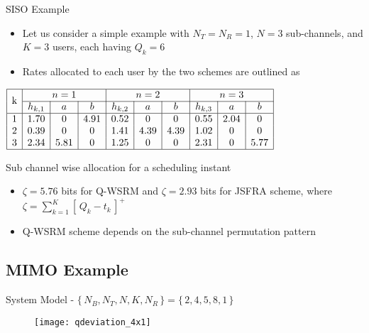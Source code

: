 \documentclass[10pt]{beamer}
\newcommand{\me}[1]{\( #1 \)}
\begin{document}
\begin{frame}{\acs{SISO} Example}
\begin{itemize}
\item Let us consider a simple example with \me{N_T = N_R = 1}, \me{N=3} sub-channels, and \me{K = 3} users, each having \me{Q_k = 6}
\item Rates allocated to each user by the two schemes are outlined as 
\end{itemize}
\begin{table}
\centering
\renewcommand{\arraystretch}{1.25} \scriptsize
\( \begin{array}{|*{10}{c|}}
\hline
\multirow{2}{*}{{k}} & \multicolumn{3}{c|}{{n = 1}} & \multicolumn{3}{c|}{{n = 2}} & \multicolumn{3}{c|}{{n = 3}} \\
\cline{2-10}
 & h_{k,1} & {a} & {b} & h_{k,2} & {a} & {b} & h_{k,3} & {a} & {b} \\
\hline
1 &  1.70 & 0 & 4.91 & 0.52 & 0 & 0 & 0.55 & 2.04 & 0 \\
2 &  0.39 & 0 & 0 & 1.41 & 4.39 & 4.39 & 1.02 & 0 & 0 \\
3 &  2.34 & 5.81 & 0 & 1.25 & 0 & 0 & 2.31 & 0 & 5.77 \\
\hline
\end{array} \)
\caption{Sub channel wise allocation for a scheduling instant}
\label{tbl-1}
\vspace{-0.35cm}
\end{table}
\begin{itemize}
\item \me{\zeta = 5.76} bits for \acs{Q-WSRM} and \me{\zeta = 2.93} bits for \acs{JSFRA} scheme, where \me{\zeta = \sum_{k = 1}^K \left [ \, Q_k - t_k \,\right ]^+}
\item \acs{Q-WSRM} scheme depends on the sub-channel permutation pattern
\end{itemize}
\end{frame}

\subsection{MIMO Example}

\begin{frame}{System Model - \me{\lbrace \, N_B,N_T,N,K,N_R \, \rbrace = \lbrace \, 2,4,5,8,1 \, \rbrace}}
\begin{figure}
\texttt{[image: qdeviation\_4x1]}
\end{figure}
\end{frame}
\end{document}
